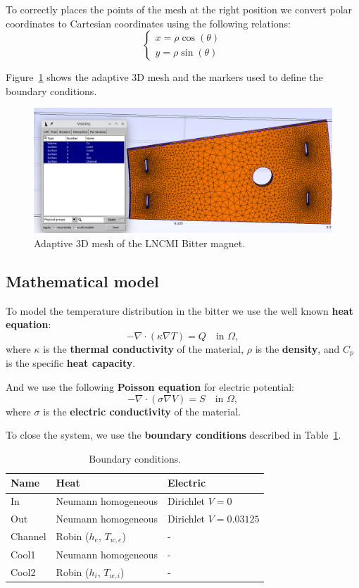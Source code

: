 \documentclass[12pt]{article}
\begin{document}
To correctly places the points of the mesh at the right position we convert polar
coordinates to Cartesian coordinates using the following relations:
$$
\begin{cases}
  x = \rho \cos(\theta) \\
  y = \rho \sin(\theta)
\end{cases}
$$

Figure~\ref{fig:mesh} shows the adaptive 3D mesh and the markers used to define
the boundary conditions.

\begin{figure}[H]
  \centering
  \includegraphics[width=\textwidth]{images/bitter_mesh.png}
  \caption{Adaptive 3D mesh of the LNCMI Bitter magnet.}
  \label{fig:mesh}
\end{figure}

\subsection{Mathematical model}
To model the temperature distribution in the bitter we use the well known \textbf{heat equation}:
$$
-\nabla \cdot (\kappa \nabla T) = Q \quad \text{in } \Omega,
$$
where $\kappa$ is the \textbf{thermal conductivity} of the material, $\rho$ is
the \textbf{density}, and $C_p$ is the specific \textbf{heat capacity}.

\noindent And we use the following \textbf{Poisson equation} for electric potential:
$$
- \nabla \cdot (\sigma \nabla V) = S \quad \text{in } \Omega,
$$
where $\sigma$ is the \textbf{electric conductivity} of the material.

To close the system, we use the \textbf{boundary conditions} described in
Table~\ref{tab:boundary_conditions}.

\begin{table}[H]
  \centering
  \renewcommand{\arraystretch}{1.5} %
  \begin{tabular}{p{3cm}p{5cm}p{4cm}}
    \toprule
    \textbf{Name} & \textbf{Heat} & \textbf{Electric} \\
    \midrule
    In & Neumann homogeneous & Dirichlet $V = 0$ \\
    Out & Neumann homogeneous & Dirichlet $V = 0.03125$ \\
    Channel & Robin ($h_e$, $T_{w,e}$) & - \\
    Cool1 & Neumann homogeneous & - \\
    Cool2 & Robin ($h_i$, $T_{w,i}$) & - \\
    \bottomrule
  \end{tabular}
  \caption{Boundary conditions.}
  \label{tab:boundary_conditions}
\end{table}
\end{document}
